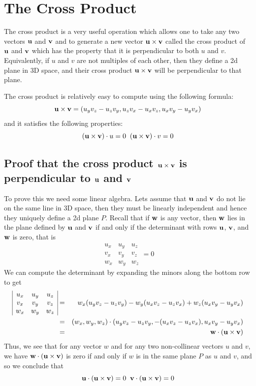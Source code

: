 \documentclass{book}
\newcommand{\vect}[1]{{\bf{ #1}}}
\begin{document}
\section{The Cross Product}
The cross product is a very useful operation which allows one to take any two
vectors $\vect u$ and $\vect v$ and to generate a new vector $\vect u \times \vect v$
called the cross product of $\vect u$ and $\vect v$ which has the property that it is
perpendicular to both $u$ and $v$. Equivalently, if $u$ and $v$ are not multiples of each other,
then they define a 2d plane in 3D space, and their cross product $\vect u \times \vect v$ will be perpendicular to that plane.

The cross product is relatively easy to compute using the following formula:
\[
\vect u \times \vect v = (u_yv_z-u_zv_y, u_zv_x-u_xv_z, u_xv_y-u_yv_x) \\
\]
and it satisfies the following properties:
\[
(\vect u \times \vect v) \cdot u = 0 \;\;
(\vect u \times \vect v) \cdot v = 0
\]

\subsection{Proof that the cross product $\vect u \times \vect v$ is perpendicular to $\vect u$ and $\vect v$}
To prove this we need some linear algebra. Lets assume that $\vect u$ and $\vect v$ do not lie on the same line
in 3D space, then they must be linearly independent and hence they uniquely define a 2d plane $P$. Recall that if
$\vect w$ is any vector, then $\vect w$ lies in the plane defined by $\vect u$ and $\vect v$ if and only if
the determinant with rows $\vect u$, $\vect v$, and $\vect w$ is zero, that is
\[
\begin{array}{|ccc|}
u_x & u_y & u_z \\
v_x & v_y & v_z \\
w_x & w_y & w_z
\end{array}
= 0
\]
We can compute the determinant by expanding the minors along the bottom row to get
\begin{eqnarray*}
\begin{array}{|ccc|}
u_x & u_y & u_z \\
v_x & v_y & v_z \\
w_x & w_y & w_z
\end{array}
&=& w_x(u_yv_z - u_zv_y) - w_y(u_xv_z - u_zv_x) + w_z(u_xv_y - u_yv_x) \\
&=& (w_x,w_y,w_z) \cdot (u_yv_z - u_zv_y, -(u_xv_z - u_zv_x) , u_xv_y - u_yv_x) \\
&=& \vect w \cdot (\vect u \times \vect v)
\end{eqnarray*}
Thus, we see that for any vector $w$ and for any two non-collinear vectors $u$ and $v$, we have $\vect w \cdot (\vect u \times \vect v) $ is zero if and only if $w$ is in the same
plane $P$ as $u$ and $v$, and so we conclude that
\[
\vect u \cdot (\vect u \times \vect v) = 0 \;\;
\vect v \cdot (\vect u \times \vect v) = 0
\]
\end{document}
